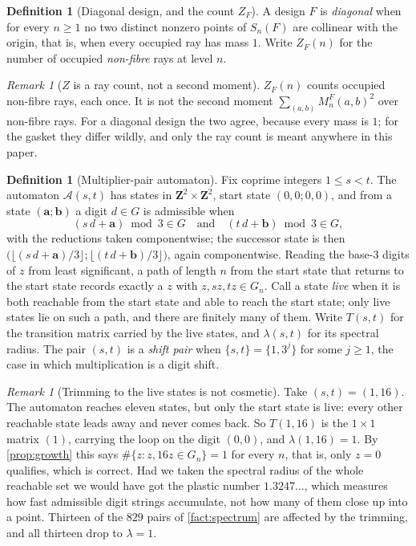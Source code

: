\documentclass[11pt]{amsart}
\theoremstyle{definition}
\newtheorem{definition}[theorem]{Definition}
\theoremstyle{remark}
\newtheorem{remark}[theorem]{Remark}
\begin{document}
\begin{definition}[Diagonal design, and the count $Z_F$]
\label{def:diag}
A design $F$ is \emph{diagonal} when for every $n\ge 1$ no two distinct nonzero points of $S_n(F)$ are collinear with the origin, that is, when every occupied ray has mass $1$. Write $Z_F(n)$ for the number of occupied \emph{non-fibre} rays at level $n$.
\end{definition}

\begin{remark}[$Z$ is a ray count, not a second moment]
\label{rem:Z}
$Z_F(n)$ counts occupied non-fibre rays, each once. It is not the second moment $\sum_{(a,b)} M_n^F(a,b)^2$ over non-fibre rays. For a diagonal design the two agree, because every mass is $1$; for the gasket they differ wildly, and only the ray count is meant anywhere in this paper.
\end{remark}

\begin{definition}[Multiplier-pair automaton]
\label{def:auto}
Fix coprime integers $1\le s<t$. The automaton $\mathcal{A}(s,t)$ has states in $\mathbf{Z}^2\times\mathbf{Z}^2$, start state $(0,0;0,0)$, and from a state $(\mathbf{a};\mathbf{b})$ a digit $d\in G$ is admissible when
\[
(s\,d+\mathbf{a}) \bmod 3 \in G \quad\text{and}\quad (t\,d+\mathbf{b}) \bmod 3 \in G ,
\]
with the reductions taken componentwise; the successor state is then $\bigl(\lfloor (s\,d+\mathbf{a})/3\rfloor;\lfloor (t\,d+\mathbf{b})/3\rfloor\bigr)$, again componentwise. Reading the base-$3$ digits of $z$ from least significant, a path of length $n$ from the start state that returns to the start state records exactly a $z$ with $z, sz, tz\in G_n$. Call a state \emph{live} when it is both reachable from the start state and able to reach the start state; only live states lie on such a path, and there are finitely many of them. Write $T(s,t)$ for the transition matrix carried by the live states, and $\lambda(s,t)$ for its spectral radius. The pair $(s,t)$ is a \emph{shift pair} when $\{s,t\}=\{1,3^j\}$ for some $j\ge 1$, the case in which multiplication is a digit shift.
\end{definition}

\begin{remark}[Trimming to the live states is not cosmetic]
\label{rem:trim}
Take $(s,t)=(1,16)$. The automaton reaches eleven states, but only the start state is live: every other reachable state leads away and never comes back. So $T(1,16)$ is the $1\times 1$ matrix $(1)$, carrying the loop on the digit $(0,0)$, and $\lambda(1,16)=1$. By \cref{prop:growth} this says $\#\{z: z, 16z\in G_n\}=1$ for every $n$, that is, only $z=0$ qualifies, which is correct. Had we taken the spectral radius of the whole reachable set we would have got the plastic number $1.3247\ldots$, which measures how fast admissible digit strings accumulate, not how many of them close up into a point. Thirteen of the $829$ pairs of \cref{fact:spectrum} are affected by the trimming, and all thirteen drop to $\lambda=1$.
\end{remark}
\end{document}
